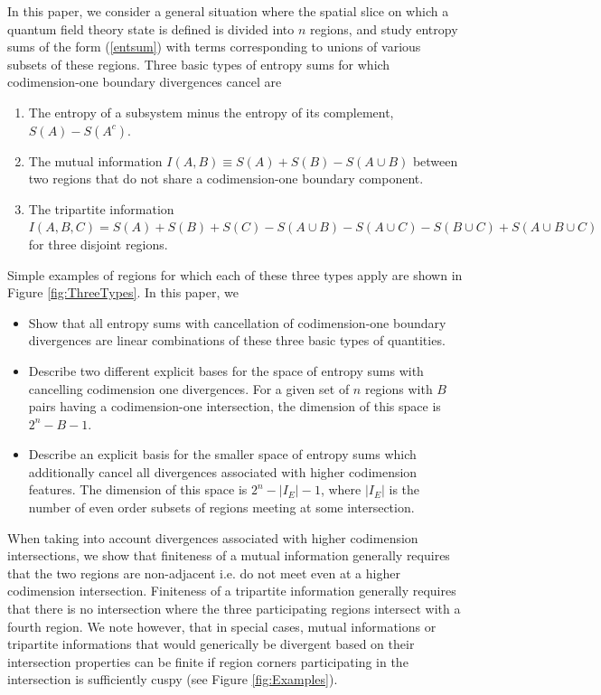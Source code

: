 \documentclass[12pt]{article}
\theoremstyle{definition}
\begin{document}
In this paper, we consider a general situation where the spatial slice on which a quantum field theory state is defined is divided into $n$ regions, and study entropy sums of the form (\ref{entsum}) with terms corresponding to unions of various subsets of these regions. Three basic types of entropy sums for which codimension-one boundary divergences cancel are
\begin{enumerate}
    \item The entropy of a subsystem minus the entropy of its complement, $S(A) - S(A^c)$. 
    \item The mutual information $I(A,B) \equiv S(A) + S(B) - S(A \cup B)$ between two regions that do not share a codimension-one boundary component.
    \item The tripartite information  $I(A,B,C) = S(A) + S(B) + S(C) - S(A \cup B) - S(A \cup C) - S(B \cup C) + S(A \cup B \cup C)$ for  three disjoint regions.
\end{enumerate}
Simple examples of regions for which each of these three types apply are shown in Figure \ref{fig:ThreeTypes}. In this paper, we
\begin{itemize}
    \item Show that all entropy sums with cancellation of codimension-one boundary divergences are linear combinations of these three basic types of quantities. 
    \item Describe two different explicit bases for the space of  entropy sums with cancelling codimension one divergences. For a given set of $n$ regions with $B$ pairs having a codimension-one intersection, the dimension of this space is $2^n - B -1$.
    \item
    Describe an explicit basis for the smaller space of entropy sums which additionally cancel all divergences associated with higher codimension features. The dimension of this space is $2^n - |I_E| - 1$, where $|I_E|$ is the number of even order subsets of regions meeting at some intersection. 
\end{itemize} 

When taking into account divergences associated with higher codimension intersections, we show that finiteness of a mutual information generally requires that the two regions are non-adjacent i.e. do not meet even at a higher codimension intersection. Finiteness of a tripartite information generally requires that there is no intersection where the three participating regions intersect with a fourth region. We note however, that in special cases, mutual informations or tripartite informations that would generically be divergent based on their intersection properties can be finite if region corners participating in the intersection is sufficiently cuspy \cite{CasiniHuerta2007_Universal2p1} (see Figure \ref{fig:Examples}).
\end{document}
